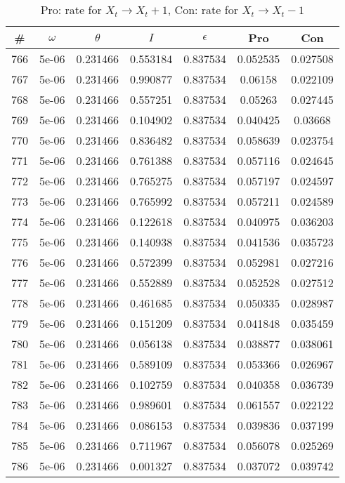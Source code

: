 \newpage
\begin{table}
\caption{Pro: rate for $X_t \rightarrow X_t + 1$, Con: rate for $X_t \rightarrow X_t - 1$}
\begin{tabular*}{\linewidth}{c|c|c|c|c|c|c}
\# & $\omega$ & $\theta$ & $I$ & $\epsilon$ & Pro & Con \\
\hline
766 & 5e-06 & 0.231466 & 0.553184 & 0.837534 & 0.052535 & 0.027508\\
767 & 5e-06 & 0.231466 & 0.990877 & 0.837534 & 0.06158 & 0.022109\\
768 & 5e-06 & 0.231466 & 0.557251 & 0.837534 & 0.05263 & 0.027445\\
769 & 5e-06 & 0.231466 & 0.104902 & 0.837534 & 0.040425 & 0.03668\\
770 & 5e-06 & 0.231466 & 0.836482 & 0.837534 & 0.058639 & 0.023754\\
771 & 5e-06 & 0.231466 & 0.761388 & 0.837534 & 0.057116 & 0.024645\\
772 & 5e-06 & 0.231466 & 0.765275 & 0.837534 & 0.057197 & 0.024597\\
773 & 5e-06 & 0.231466 & 0.765992 & 0.837534 & 0.057211 & 0.024589\\
774 & 5e-06 & 0.231466 & 0.122618 & 0.837534 & 0.040975 & 0.036203\\
775 & 5e-06 & 0.231466 & 0.140938 & 0.837534 & 0.041536 & 0.035723\\
776 & 5e-06 & 0.231466 & 0.572399 & 0.837534 & 0.052981 & 0.027216\\
777 & 5e-06 & 0.231466 & 0.552889 & 0.837534 & 0.052528 & 0.027512\\
778 & 5e-06 & 0.231466 & 0.461685 & 0.837534 & 0.050335 & 0.028987\\
779 & 5e-06 & 0.231466 & 0.151209 & 0.837534 & 0.041848 & 0.035459\\
780 & 5e-06 & 0.231466 & 0.056138 & 0.837534 & 0.038877 & 0.038061\\
781 & 5e-06 & 0.231466 & 0.589109 & 0.837534 & 0.053366 & 0.026967\\
782 & 5e-06 & 0.231466 & 0.102759 & 0.837534 & 0.040358 & 0.036739\\
783 & 5e-06 & 0.231466 & 0.989601 & 0.837534 & 0.061557 & 0.022122\\
784 & 5e-06 & 0.231466 & 0.086153 & 0.837534 & 0.039836 & 0.037199\\
785 & 5e-06 & 0.231466 & 0.711967 & 0.837534 & 0.056078 & 0.025269\\
786 & 5e-06 & 0.231466 & 0.001327 & 0.837534 & 0.037072 & 0.039742\\

\end{tabular*}
\end{table}
